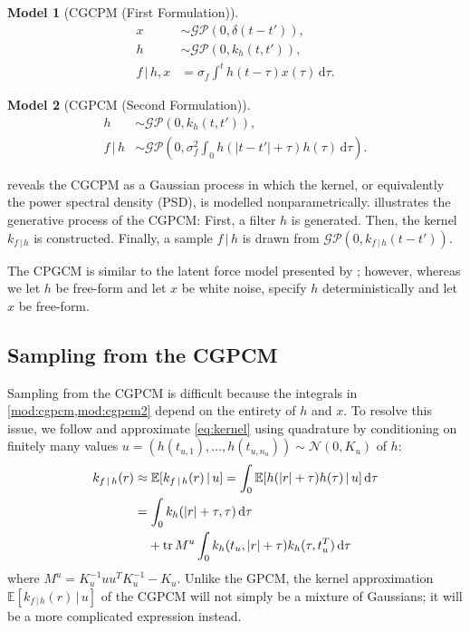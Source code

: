 \documentclass{article}
\newcommand{\tr}{\operatorname{tr}}
\newcommand{\id}[1]{\, \mathrm{d} #1}     %
\newcommand{\cond}{\, | \,}               %
\newcommand{\phan}[1]{\hphantom{#1\;}}
\newtheorem{model}{Model}
\begin{document}
\begin{model}[CGCPM (First Formulation)] \label{mod:cgpcm}
    \begin{align*}
        x &\sim \mathcal{GP}(0,\delta(t-t')), \\
        h &\sim \mathcal{GP}(0, k_h(t,t')), \\
        f\cond h, x &= \sigma_f \int^t h(t- \tau)x(\tau)\id{\tau}.
    \end{align*}
\end{model}
\begin{model}[CGPCM (Second Formulation)] \label{mod:cgpcm2}
    \begin{align*}
        h &\sim \mathcal{GP}(0, k_h(t,t')), \\
        f \cond h &\sim \mathcal{GP}(0,  \sigma_f^2\int_0 h(|t-t'|+\tau)h(\tau)\id{\tau}).
    \end{align*}
\end{model}

 reveals the CGCPM as a Gaussian process in which the kernel, or equivalently the power spectral density (PSD), is modelled nonparametrically.  illustrates the generative process of the CGPCM: First, a filter $h$ is generated. Then, the kernel $k_{f\cond h}$ is constructed. Finally, a sample $f\cond h$ is drawn from $\mathcal{GP}(0,k_{f \cond h}(t-t'))$.

The CPGCM is similar to the latent force model presented by \citet{Alvarez:2009:Latent_Force_Models}; however, whereas we let $h$ be free-form and let $x$ be white noise, \citet{Alvarez:2009:Latent_Force_Models} specify $h$ deterministically and let $x$ be free-form.

\subsection{Sampling from the CGPCM}
Sampling from the CGPCM is difficult because the integrals in \cref{mod:cgpcm,mod:cgpcm2} depend on the entirety of $h$ and $x$. To resolve this issue, we follow \citet{Tobar:2015:Learning_Stationary} and approximate \cref{eq:kernel} using quadrature \cite{Minka:2000:Quadrature_GP} by conditioning on finitely many values $u=(h(t_{u,1}),\ldots,h(t_{u,n_u}))\sim \mathcal{N}(0,K_u)$ of $h$:
\begin{align*}
    k_{f\cond h}(r)
    &\approx \mathbb{E}[k_{f\cond h}(r)\cond u]
    = \int_{0} \mathbb{E}[h(|r| + \tau) h(\tau)\cond u] \id{\tau} \\
    &= \int_0 k_h(|r| + \tau, \tau) \id{\tau} \\
    &\phan{=}+ \tr M^u \int_{0} k_h(t_u, |r|+ \tau)k_h(\tau, t_u^T) \id{\tau}
\end{align*}
where $M^{u}=K_u^{-1}uu^T K_u^{-1}-K_u$. Unlike the GPCM, the kernel approximation $\mathbb{E}[k_{f\cond h}(r)\cond u]$ of the CGPCM will not simply be a mixture of Gaussians; it will be a more complicated expression instead.
\end{document}
